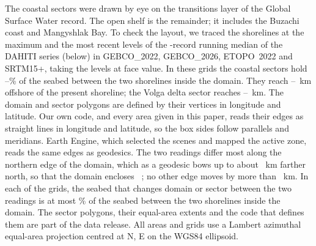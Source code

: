 The coastal sectors were drawn by eye on the transitions layer of the Global Surface Water record\citep{pekel2016}. The open shelf is the remainder; it includes the Buzachi coast and Mangyshlak Bay. To check the layout, we traced the shorelines at the maximum and the most recent levels of the -record running median of the DAHITI series (below) in GEBCO\_2022, GEBCO\_2026, ETOPO~2022 and SRTM15+, taking the levels at face value. In these grids the coastal sectors hold --\% of the seabed between the two shorelines inside the domain. They reach --~km offshore of the present shoreline; the Volga delta sector reaches --~km. The domain and sector polygons are defined by their vertices in longitude and latitude. Our own code, and every area given in this paper, reads their edges as straight lines in longitude and latitude, so the box sides follow parallels and meridians. Earth Engine, which selected the scenes and mapped the active zone, reads the same edges as geodesics. The two readings differ most along the northern edge of the domain, which as a geodesic bows up to about ~km farther north, so that the domain encloses ~\kmsq{}; no other edge moves by more than ~km. In each of the grids, the seabed that changes domain or sector between the two readings is at most \% of the seabed between the two shorelines inside the domain. The sector polygons, their equal-area extents and the code that defines them are part of the data release. All areas and grids use a Lambert azimuthal equal-area projection centred at \textdegree{}N, \textdegree{}E on the WGS84 ellipsoid.

